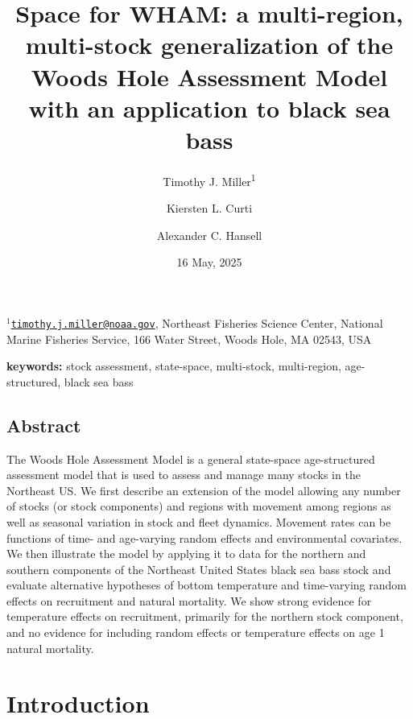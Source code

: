 \documentclass[
]{article}
\title{Space for WHAM: a multi-region, multi-stock generalization of the Woods Hole Assessment Model with an application to black sea bass}
\author{Timothy J. Miller\textsuperscript{1} \and Kiersten L. Curti \and Alexander C. Hansell}
\date{16 May, 2025}
\begin{document}
\maketitle

\(^1\)\href{mailto:timothy.j.miller@noaa.gov}{\nolinkurl{timothy.j.miller@noaa.gov}}, Northeast Fisheries Science Center, National Marine Fisheries Service, 166 Water Street, Woods Hole, MA 02543, USA\\

\pagebreak

\textbf{keywords:} stock assessment, state-space, multi-stock, multi-region, age-structured, black sea bass

\hypertarget{abstract}{%
\subsection*{Abstract}\label{abstract}}

The Woods Hole Assessment Model is a general state-space age-structured assessment model that is used to assess and manage many stocks in the Northeast US. We first describe an extension of the model allowing any number of stocks (or stock components) and regions with movement among regions as well as seasonal variation in stock and fleet dynamics. Movement rates can be functions of time- and age-varying random effects and environmental covariates. We then illustrate the model by applying it to data for the northern and southern components of the Northeast United States black sea bass stock and evaluate alternative hypotheses of bottom temperature and time-varying random effects on recruitment and natural mortality. We show strong evidence for temperature effects on recruitment, primarily for the northern stock component, and no evidence for including random effects or temperature effects on age 1 natural mortality.

\pagebreak

\hypertarget{introduction}{%
\section*{Introduction}\label{introduction}}
\end{document}
